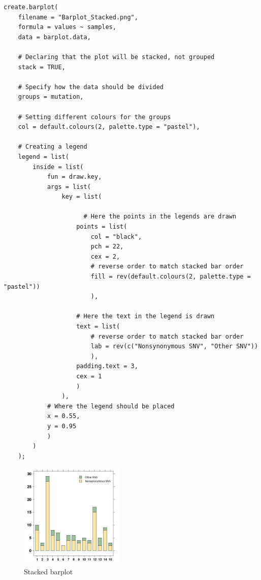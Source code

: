 \documentclass[letterpaper]{article}
\begin{document}
\begin{verbatim}
create.barplot(
    filename = "Barplot_Stacked.png",
    formula = values ~ samples,
    data = barplot.data,
    
    # Declaring that the plot will be stacked, not grouped
    stack = TRUE,
    
    # Specify how the data should be divided
    groups = mutation,
    
    # Setting different colours for the groups
    col = default.colours(2, palette.type = "pastel"),
    
    # Creating a legend 
    legend = list(
        inside = list(
            fun = draw.key,
            args = list(
                key = list(
                	
                	  # Here the points in the legends are drawn
                    points = list(
                        col = "black",
                        pch = 22,
                        cex = 2,
                        # reverse order to match stacked bar order
                        fill = rev(default.colours(2, palette.type = "pastel"))
                        ),

                    # Here the text in the legend is drawn
                    text = list(
                        # reverse order to match stacked bar order
                        lab = rev(c("Nonsynonymous SNV", "Other SNV"))
                        ),
                    padding.text = 3,
                    cex = 1
                    )
                ),
            # Where the legend should be placed
            x = 0.55,
            y = 0.95
            )
        )
    );
\end{verbatim}

\begin{figure}[!ht]
  \begin{center}
     \includegraphics[width=50mm]{Figures/Barplot_Stacked.png}
     \caption{Stacked barplot}
  \end{center}
\end{figure}
\end{document}
